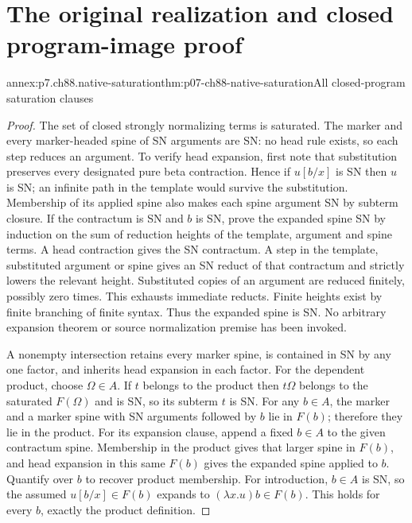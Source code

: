 \section{The original realization and closed program-image proof}

\begin{annexitem}{annex:p7.ch88.native-saturation}{thm:p07-ch88-native-saturation}{All closed-program saturation clauses}
\begin{proof}
The set of closed strongly normalizing terms is saturated. The marker
and every marker-headed spine of SN arguments are SN: no head rule
exists, so each step reduces an argument. To verify head expansion,
first note that substitution preserves every designated pure beta
contraction. Hence if \(u[b/x]\) is SN then \(u\) is SN; an
infinite path in the template would survive the substitution. Membership
of its applied spine also makes each spine argument SN by subterm closure.
If the contractum is SN and \(b\) is SN, prove the expanded spine SN
by induction on the sum of reduction heights of the template, argument
and spine terms. A head contraction gives the SN contractum. A step in
the template, substituted argument or spine gives an SN reduct of that
contractum and strictly lowers the relevant height. Substituted copies
of an argument are reduced finitely, possibly zero times. This exhausts
immediate reducts. Finite heights exist by finite branching of finite
syntax. Thus the expanded spine is SN. No arbitrary expansion theorem
or source normalization premise has been invoked.

A nonempty intersection retains every marker spine, is contained in SN
by any one factor, and inherits head expansion in each factor. For the
dependent product, choose \(\Omega\in A\). If \(t\) belongs to
the product then \(t\Omega\) belongs to the saturated \(F(\Omega)\)
and is SN, so its subterm \(t\) is SN. For any \(b\in A\), the
marker and a marker spine with SN arguments followed by \(b\) lie
in \(F(b)\); therefore they lie in the product. For its expansion
clause, append a fixed \(b\in A\) to the given contractum spine.
Membership in the product gives that larger spine in \(F(b)\), and
head expansion in this same \(F(b)\) gives the expanded spine applied
to \(b\). Quantify over \(b\) to recover product membership.
For introduction, \(b\in A\) is SN, so the assumed
\(u[b/x]\in F(b)\) expands to \((\lambda x.u)b\in F(b)\).
This holds for every \(b\), exactly the product definition.
\end{proof}
\end{annexitem}

